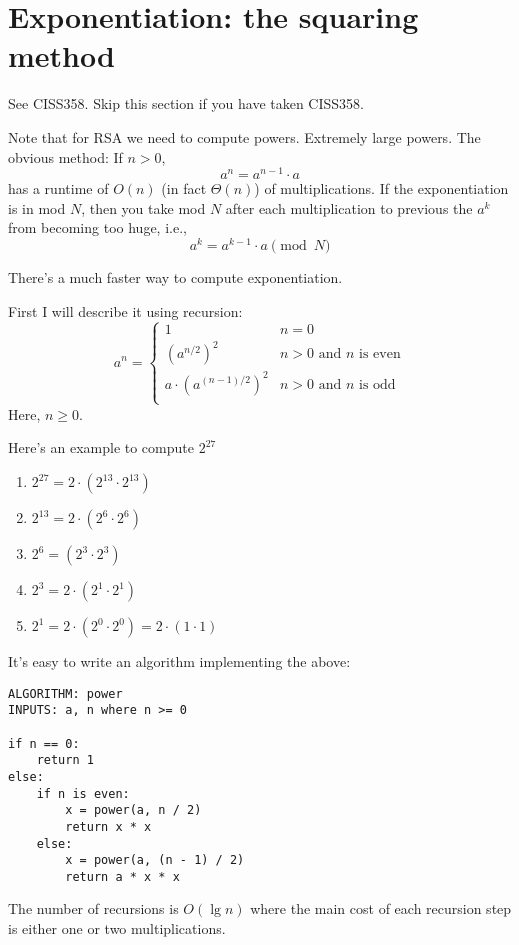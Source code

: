 \section{Exponentiation: the squaring method}

See CISS358. Skip this section if you have taken CISS358.

Note that for RSA we need to compute powers. Extremely large
powers.
The obvious method: If $n > 0$,
\[
a^n = a^{n-1} \cdot a
\]
has a runtime of $O(n)$ (in fact $\Theta(n)$) of multiplications.
If the exponentiation is in mod $N$, then
you take mod $N$ after each multiplication to previous
the $a^k$ from becoming too huge, i.e.,
\[
a^k = a^{k-1} \cdot a \pmod{N}
\]

There's a much faster way to compute exponentiation.

First I will describe it using recursion:
\[
a^n =
\begin{cases}
  1 & n = 0 \\
  \left( a^{n/2} \right)^2 & n > 0 \text{ and $n$ is even} \\
  a \cdot \left( a^{(n - 1)/2} \right)^2 & n > 0 \text{ and $n$ is odd} \\
\end{cases}
\]
Here, $n \geq 0$.

\begin{eg}
Here's an example to compute $2^{27}$
\begin{enumerate}[nosep]
\item $2^{27} = 2 \cdot \left( 2^{13} \cdot 2^{13} \right) $
\item $2^{13} = 2 \cdot \left( 2^{6} \cdot 2^{6} \right) $
\item $2^6 = \left( 2^3 \cdot 2^3 \right)$
\item $2^3 = 2 \cdot \left( 2^1 \cdot 2^1 \right)$
\item $2^1 = 2 \cdot \left( 2^0 \cdot 2^0 \right) = 2 \cdot \left( 1 \cdot 1 \right)$
\end{enumerate}
\end{eg}

It's easy to write an algorithm implementing the above:
\begin{Verbatim}[frame=single,fontsize=\footnotesize]
ALGORITHM: power
INPUTS: a, n where n >= 0

if n == 0:
    return 1
else:
    if n is even: 
        x = power(a, n / 2)
        return x * x
    else:
        x = power(a, (n - 1) / 2)
        return a * x * x
\end{Verbatim}
The number of recursions is $O(\lg n)$ where the main
cost of each recursion step is either one or two multiplications.

